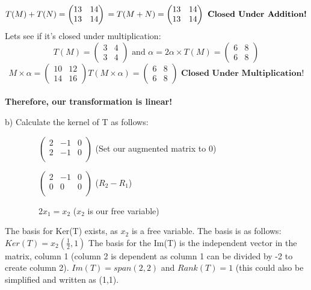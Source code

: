 \documentclass{article}
\begin{document}
$$
T(M) + T(N)  =\begin{pmatrix}
    13 & 14\\
    13 & 14
\end{pmatrix} \\
=
T(M+N) =\begin{pmatrix}
    13 & 14\\
    13 & 14
\end{pmatrix} \textbf{ Closed Under Addition!}\\
$$
Lets see if it's closed under multiplication:
$$
T(M) =\begin{pmatrix}
    3 & 4\\
    3 & 4
\end{pmatrix} \text{ and } \alpha = 2 \alpha \times T(M) =\begin{pmatrix}
    6 & 8\\
    6 & 8
\end{pmatrix}  $$
$$
M \times \alpha =\begin{pmatrix}
    10 & 12\\
    14 & 16
\end{pmatrix} T(M\times \alpha) =\begin{pmatrix}
    6 & 8\\
    6 & 8
\end{pmatrix} \textbf{ Closed Under Multiplication!}
$$ \\
\textbf{Therefore, our transformation is linear!}

\par
b) Calculate the kernel of T as follows:

\(\qquad \qquad  \begin{pmatrix}
    2 & -1 & 0\\
    2 & -1 & 0 \\
\end{pmatrix} 
 \) (Set our augmented matrix to 0)


\(\qquad \qquad  \begin{pmatrix}
    2 & -1 & 0\\
    0 & 0 & 0 \\
\end{pmatrix} 
 \) ($R_2 - R_1$)

\( \qquad \qquad
2x_1 = x_2
\) ($x_2$ is our free variable)

The basis for Ker(T) exists, as $x_2$ is a free variable. The basis is as follows: $Ker(T) = x_2(\frac{1}{2},1)$ The basis for the Im(T) is the independent vector in the matrix, column 1 (column 2 is dependent as column 1 can be divided by -2 to create column 2). $Im(T) = span(2,2)$ and $Rank(T)=1$ (this could also be simplified and written as (1,1). 
\end{document}
